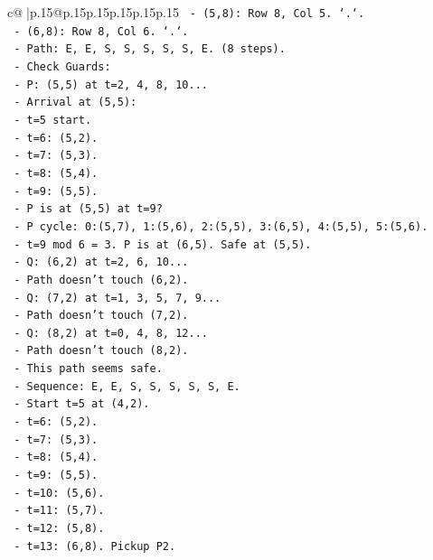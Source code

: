 \documentclass{article}
\begin{document}
{\begin{supertabular}{c@{$\;$}|p{.15\linewidth}@{}p{.15\linewidth}p{.15\linewidth}p{.15\linewidth}p{.15\linewidth}p{.15\linewidth}}
{{{\texttt{    {-} (5,8): Row 8, Col 5. `.`.} \\
\texttt{    {-} (6,8): Row 8, Col 6. `.`.} \\
\texttt{    {-} Path: E, E, S, S, S, S, S, E. (8 steps).} \\
\texttt{    {-} Check Guards:} \\
\texttt{      {-} P: (5,5) at t=2, 4, 8, 10...} \\
\texttt{        {-} Arrival at (5,5):} \\
\texttt{          {-} t=5 start.} \\
\texttt{          {-} t=6: (5,2).} \\
\texttt{          {-} t=7: (5,3).} \\
\texttt{          {-} t=8: (5,4).} \\
\texttt{          {-} t=9: (5,5).} \\
\texttt{          {-} P is at (5,5) at t=9?} \\
\texttt{          {-} P cycle: 0:(5,7), 1:(5,6), 2:(5,5), 3:(6,5), 4:(5,5), 5:(5,6).} \\
\texttt{          {-} t=9 mod 6 = 3. P is at (6,5). Safe at (5,5).} \\
\texttt{      {-} Q: (6,2) at t=2, 6, 10...} \\
\texttt{        {-} Path doesn't touch (6,2).} \\
\texttt{      {-} Q: (7,2) at t=1, 3, 5, 7, 9...} \\
\texttt{        {-} Path doesn't touch (7,2).} \\
\texttt{      {-} Q: (8,2) at t=0, 4, 8, 12...} \\
\texttt{        {-} Path doesn't touch (8,2).} \\
\texttt{    {-} This path seems safe.} \\
\texttt{    {-} Sequence: E, E, S, S, S, S, S, E.} \\
\texttt{    {-} Start t=5 at (4,2).} \\
\texttt{    {-} t=6: (5,2).} \\
\texttt{    {-} t=7: (5,3).} \\
\texttt{    {-} t=8: (5,4).} \\
\texttt{    {-} t=9: (5,5).} \\
\texttt{    {-} t=10: (5,6).} \\
\texttt{    {-} t=11: (5,7).} \\
\texttt{    {-} t=12: (5,8).} \\
\texttt{    {-} t=13: (6,8). Pickup P2.} \\
}}}
\end{supertabular}}
\end{document}
